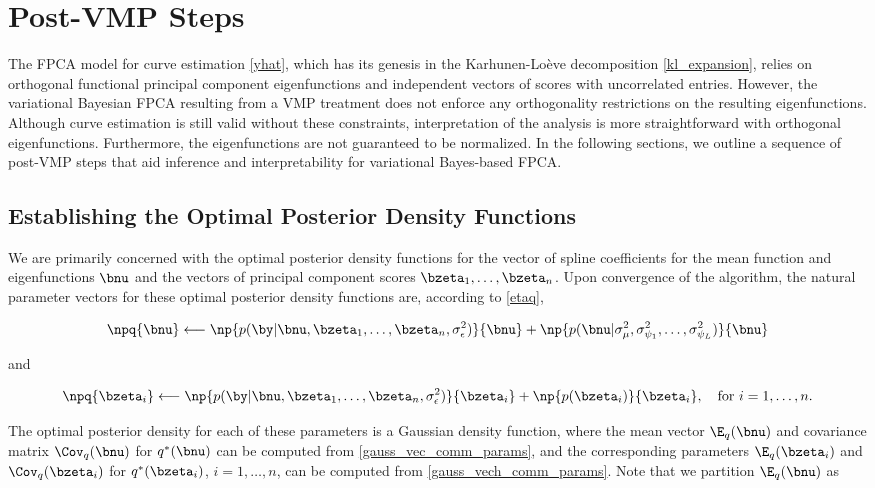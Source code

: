 \documentclass[12pt]{article}
\def\sigsqeps{\sigma^2_{\epsilon}}
\def\sigsqmu{\sigma^2_{\mu}}
\newcommand\sigsqpsi[1]{\sigma^2_{\psi_{#1}}}
\theoremstyle{plain}
\theoremstyle{definition}
\theoremstyle{remark}
\begin{document}
\section{Post-VMP Steps}
\label{sec:post_vmp_steps}

The FPCA model for curve estimation \eqref{yhat}, which has its genesis in the Karhunen-Lo\`{e}ve decomposition
\eqref{kl_expansion}, relies on orthogonal functional principal component
eigenfunctions and independent vectors of scores with uncorrelated entries.
However, the variational Bayesian FPCA resulting from a VMP treatment
does not enforce any orthogonality restrictions on the resulting eigenfunctions. Although curve estimation is still
valid without these constraints, interpretation of the analysis is more straightforward with orthogonal
eigenfunctions. Furthermore, the eigenfunctions are not guaranteed to be normalized.
In the following sections, we outline
a sequence of post-VMP steps that aid inference and interpretability for variational Bayes-based FPCA.


\subsection{Establishing the Optimal Posterior Density Functions}
\label{sec:opt_dens_funcs}

We are primarily concerned with the optimal posterior density functions for the vector of spline coefficients for
the mean function and eigenfunctions $\bnu$ and the vectors of principal component scores $\bzeta_1, \dots,
\bzeta_n$. Upon convergence of the algorithm, the natural parameter vectors for these optimal posterior density
functions are, according to \eqref{etaq},

\[
	\npq{\bnu} \longleftarrow
		\np{p (\by | \bnu, \bzeta_1, \dots, \bzeta_n, \sigsqeps)}{\bnu}
		+ \np{p (\bnu | \sigsqmu, \sigsqpsi{1}, \dots, \sigsqpsi{L})}{\bnu}
\]

\noindent and

\[
	\npq{\bzeta_i} \longleftarrow
		\np{p (\by | \bnu, \bzeta_1, \dots, \bzeta_n, \sigsqeps)}{\bzeta_i}
		+ \np{p (\bzeta_i)}{\bzeta_i}, \quad
	\text{for $i = 1, \dots, n$.}
\]

\noindent The optimal posterior density for each of these parameters is a Gaussian density
function, where the mean vector $\E_q (\bnu)$ and covariance matrix $\Cov_q (\bnu)$ for $q^* (\bnu)$
can be computed from
\eqref{gauss_vec_comm_params}, and the corresponding parameters $\E_q (\bzeta_i)$ and $\Cov_q (\bzeta_i)$
for $q^* (\bzeta_i)$, $i = 1, \dots, n$, can be
computed from \eqref{gauss_vech_comm_params}. Note that we partition $\E_q (\bnu)$ as
\end{document}
